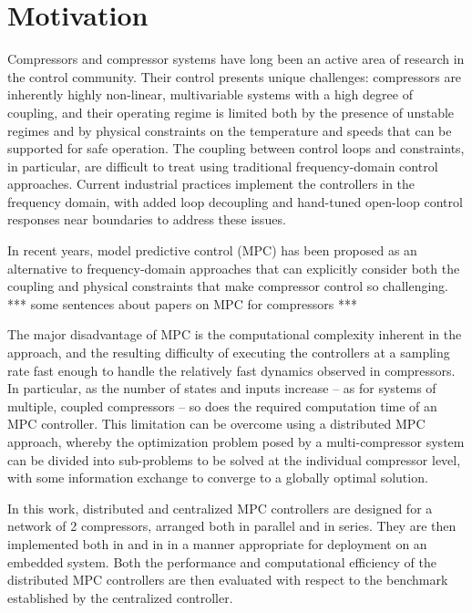 \section{Motivation}
\label{sec:intro:motivation}

Compressors and compressor systems have long been an active area of research in the control community.
Their control presents unique challenges: compressors are inherently highly non-linear, multivariable systems with a high degree of coupling, and their operating regime is limited both by the presence of unstable regimes and by physical constraints on the temperature and speeds that can be supported for safe operation.
The coupling between control loops and constraints, in particular, are difficult to treat using traditional frequency-domain control approaches.
Current industrial practices implement the controllers in the frequency domain, with added loop decoupling and hand-tuned open-loop control responses near boundaries to address these issues.

In recent years, model predictive control (MPC) has been proposed as an alternative to frequency-domain approaches that can explicitly consider both the coupling and physical constraints that make compressor control so challenging.
*** some sentences about papers on MPC for compressors ***

The major disadvantage of MPC is the computational complexity inherent in the approach, and the resulting difficulty of executing the controllers at a sampling rate fast enough to handle the relatively fast dynamics observed in compressors. 
In particular, as the number of states and inputs increase -- as for systems of multiple, coupled compressors -- so does the required computation time of an MPC controller.
This limitation can be overcome using a distributed MPC approach, whereby the optimization problem posed by a multi-compressor system can be divided into sub-problems to be solved at the individual compressor level, with some information exchange to converge to a globally optimal solution. 

In this work, distributed and centralized MPC controllers are designed for a network of 2 compressors, arranged both in parallel and in series. 
They are then implemented both in \slink{} and in \cpp{} in a manner appropriate for deployment on an embedded system.
Both the performance and computational efficiency of the distributed MPC controllers are then evaluated with respect to the benchmark established by the centralized controller.


